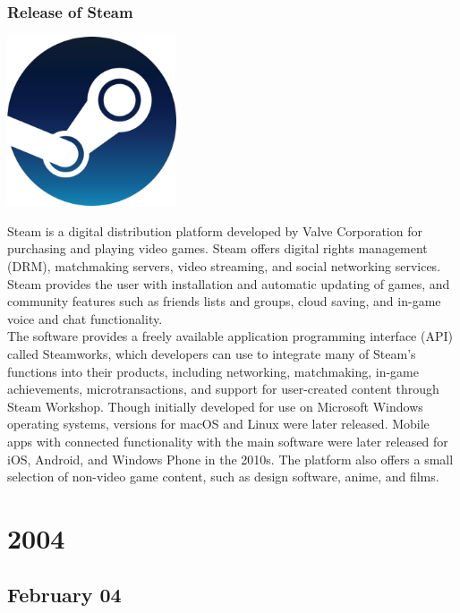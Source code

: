 \documentclass[11pt]{report}
\begin{document}
\subsection{Release of Steam}
\vspace{2mm}\begin{center}\includegraphics[width=5cm]{./img/steamLogo.jpg}\end{center}
Steam is a digital distribution platform developed by Valve Corporation for purchasing and playing video games. Steam offers digital rights management (DRM), matchmaking servers, video streaming, and social networking services. Steam provides the user with installation and automatic updating of games, and community features such as friends lists and groups, cloud saving, and in-game voice and chat functionality.\\
\indent The software provides a freely available application programming interface (API) called Steamworks, which developers can use to integrate many of Steam's functions into their products, including networking, matchmaking, in-game achievements, microtransactions, and support for user-created content through Steam Workshop. Though initially developed for use on Microsoft Windows operating systems, versions for macOS and Linux were later released. Mobile apps with connected functionality with the main software were later released for iOS, Android, and Windows Phone in the 2010s. The platform also offers a small selection of non-video game content, such as design software, anime, and films.

\chapter{2004}
\section{February 04}
\end{document}
